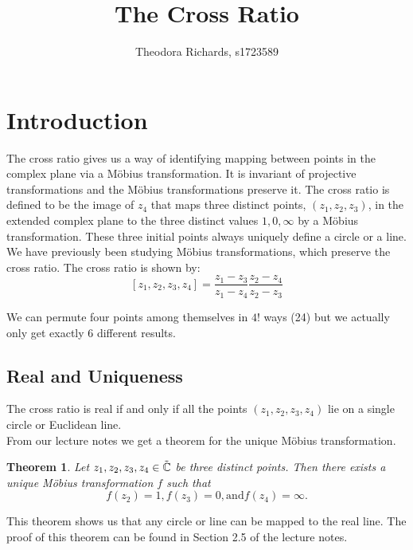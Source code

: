 \documentclass[a4paper,11pt]{article}
\title{The Cross Ratio}
\author{Theodora Richards, s1723589}
\newtheorem{thm}[prop]{Theorem}
\theoremstyle{definition}
\begin{document}
\maketitle

\section{Introduction}
The cross ratio gives us a way of identifying mapping between points in the complex plane via a Möbius transformation. It is invariant of projective transformations and the Möbius transformations preserve it.
The cross ratio is defined to be the image of $z_4$ that maps three distinct points, $(z_1, z_2, z_3)$, in the extended complex plane to the three distinct values $1, 0, \infty$ by a Möbius transformation. These three initial points always uniquely define a circle or a line. \\
We have previously been studying Möbius transformations, which preserve the cross ratio. 
The cross ratio is shown by:
$$ [z_1, z_2, z_3, z_4] = \frac{z_1 - z_3}{z_1 - z_4}\frac{z_2 - z_4}{z_2 - z_3}$$

We can permute four points among themselves in $4!$ ways (24) but we actually only get exactly 6 different results. \\
\subsection{Real and Uniqueness}
The cross ratio is real if and only if all the points $(z_1, z_2, z_3, z_4)$ lie on a single circle or Euclidean line. \\
From our lecture notes we get a theorem for the unique Möbius transformation. {\autocite{bickerton_2021_honours}}
\begin{thm}{\autocite{bickerton_2021_honours}}
Let $z_1, z_2, z_3, z_4 \in \Tilde{\mathbb{C}}$ be three distinct points. Then there exists a unique Möbius transformation $f$ such that
$$ f(z_2) = 1, f(z_3) = 0, \text{and} f(z_4) = \infty. $$
\end{thm}
This theorem shows us that any circle or line can be mapped to the real line.
The proof of this theorem can be found in Section 2.5 of the lecture notes.{\autocite{bickerton_2021_honours}} \\
\end{document}
